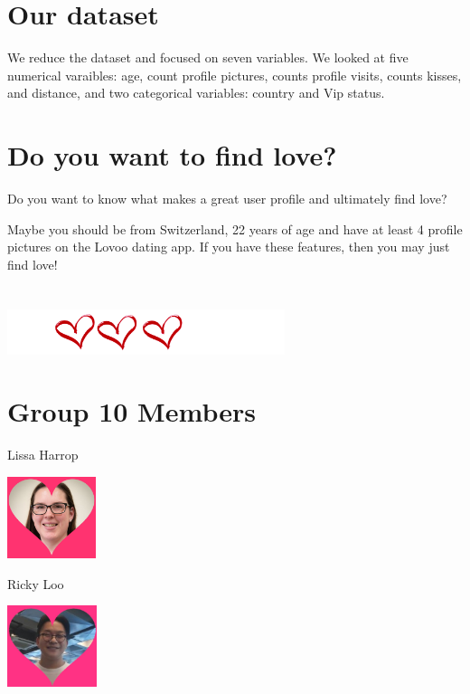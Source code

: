 \documentclass[12pt,notumble, nofoldmark]{leaflet}
\begin{document}
{\clearpage
\section{Our dataset}
We reduce the dataset and focused on seven variables. We looked at five numerical varaibles: age, count profile pictures, counts profile visits, counts kisses, and distance, and two categorical variables: country and Vip status.

\section{Do you want to find love?}
Do you want to know what makes a great user profile and ultimately find love? \newline

Maybe you should be from Switzerland, 22 years of age and have at least 4 profile pictures on the Lovoo dating app. If you have these features, then you may just find love!

\section{}
\begin{center}
  \includegraphics[height=50px]{"../../Images/PNG/Hearts_final.png"}
\end{center}


\clearpage
\section{Group 10 Members}

Lissa Harrop
\begin{center}
  \includegraphics[height=90px]{"../../Images/JPG/lissa-harrop.jpg"}
\end{center} 

Ricky Loo
\begin{center}
  \includegraphics[height=90px]{"../../Images/JPG/Ricky.jpg"}
\end{center} 

}
\end{document}
